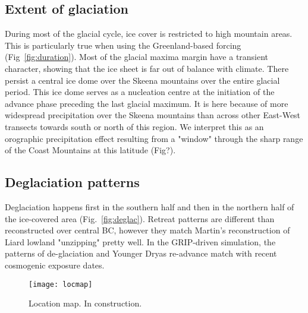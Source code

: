 \documentclass[tc, ms]{copernicus}
\begin{document}
\subsection{Extent of glaciation}

During most of the glacial cycle, ice cover is restricted to high mountain
areas. This is particularly true when using the Greenland-based forcing
(Fig~\ref{fig:duration}). Most of the glacial maxima margin have a transient
character, showing that the ice sheet is far out of balance with climate. There
persist a central ice dome over the Skeena mountains over the entire glacial
period. This ice dome serves as a nucleation centre at the initiation of the
advance phase preceding the last glacial maximum. It is here because of more
widespread precipitation over the Skeena mountains than across other East-West
transects towards south or north of this region. We interpret this as an
orographic precipitation effect resulting from a "window" through the sharp
range of the Coast Mountains at this latitude (Fig?).

\subsection{Deglaciation patterns}

Deglaciation happens first in the southern half and then in the northern half
of the ice-covered area (Fig.~\ref{fig:deglac}). Retreat patterns are different
than reconstructed over central BC, however they match Martin's reconstruction
of Liard lowland "unzipping" pretty well. In the GRIP-driven simulation, the
patterns of de-glaciation and Younger Dryas re-advance match with recent
cosmogenic exposure dates.

\conclusions
\label{sec:concl}


%


\begin{figure}
  \texttt{[image: locmap]}
  \caption{Location map. In construction.}
  \label{fig:locmap}
\end{figure}
\end{document}
